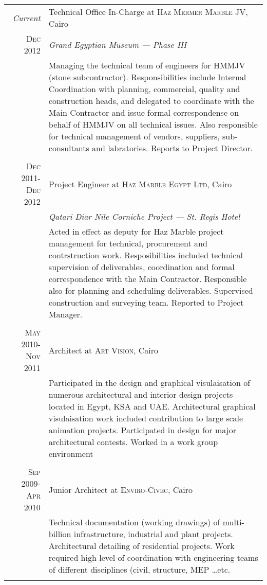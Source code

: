 \documentclass[a4paper,10pt]{article} %
\begin{document}
\begin{tabular}{r|p{11cm}}
\emph{Current} & Technical Office In-Charge at \textsc{Haz Mermer Marble JV}, Cairo\\
\textsc{Dec 2012} & \emph{Grand Egyptian Museum --- Phase III}\\ 
& \footnotesize{Managing the technical team of engineers for HMMJV (stone subcontractor). Responsibilities include Internal Coordination with planning, commercial, quality and construction heads, and delegated to coordinate with the Main Contractor and issue formal correspondense on behalf of HMMJV on all technical issues. Also responsible for technical management of vendors, suppliers, sub-consultants and labratories. Reports to Project Director.}\\
\multicolumn{2}{c}{} \\


\textsc{Dec 2011-Dec 2012} & Project Engineer at \textsc{Haz Marble Egypt Ltd}, Cairo \\
& \emph{Qatari Diar Nile Corniche Project --- St. Regis Hotel} \\
& \footnotesize{Acted in effect as deputy for Haz Marble project management for technical, procurement and contrstruction work. Resposibilities included technical supervision of deliverables, coordination and formal correspondence with the Main Contractor. Responsible also for planning and scheduling deliverables. Supervised construction and surveying team. Reported to Project Manager.}\\
\multicolumn{2}{c}{} \\


\textsc{May 2010-Nov 2011} & Architect at \textsc{Art Vision}, Cairo \emph{}\\
& \footnotesize{Participated in the design and graphical visulaisation of numerous architectural and interior design projects located in Egypt, KSA and UAE. Architectural graphical visulaisation work included contribution to large scale animation projects. Participated in design for major architectural contests. Worked in a work group environment}\\
\multicolumn{2}{c}{} \\



\textsc{Sep 2009-Apr 2010} & Junior Architect at \textsc{Enviro-Civec}, Cairo \emph{}\\
& \footnotesize{Technical documentation (working drawings) of multi-billion infrastructure, industrial and plant projects. Architectural detailing of residential projects. Work required high level of coordination with engineering teams of different disciplines (civil, structure, MEP \ldots{}etc.}\\
\multicolumn{2}{c}{} \\



\end{tabular}
\end{document}
